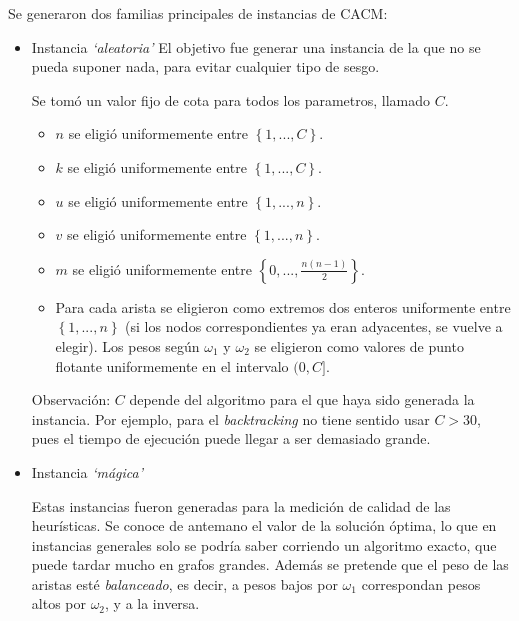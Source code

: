 Se generaron dos familias principales de instancias de CACM:

\begin{itemize}
    \item Instancia \textit{`aleatoria'}
El objetivo fue generar una instancia de la que no se pueda suponer nada, para evitar cualquier tipo de sesgo.

Se tomó un valor fijo de cota para todos los parametros, llamado $C$.

\begin{itemize}
    \item $n$ se eligió uniformemente entre $\left\{{1, ..., C}\right\}$.
    \item $k$ se eligió uniformemente entre $\left\{{1, ..., C}\right\}$.
    \item $u$ se eligió uniformemente entre $\left\{{1, ..., n}\right\}$.
    \item $v$ se eligió uniformemente entre $\left\{{1, ..., n}\right\}$.
    \item $m$ se eligió uniformemente entre $\left\{{0, ..., \frac{n(n-1)}{2}}\right\}$.
    \item Para cada arista se eligieron como extremos dos enteros uniformente entre $\left\{{1, ..., n}\right\}$ (si los nodos correspondientes ya eran adyacentes, se vuelve a elegir). Los pesos según $\omega_1$ y $\omega_2$ se eligieron como valores de punto flotante uniformemente en el intervalo $(0, C]$.
\end{itemize}
Observación: $C$ depende del algoritmo para el que haya sido generada la instancia. Por ejemplo, para el \textit{backtracking} no tiene sentido usar $C > 30$, pues el tiempo de ejecución puede llegar a ser demasiado grande.

    \item Instancia \textit{`mágica'}

Estas instancias fueron generadas para la medición de calidad de las heurísticas. Se conoce de antemano el valor de la solución óptima, lo que en instancias generales solo se podría saber corriendo un algoritmo exacto, que puede tardar mucho en grafos grandes. Además se pretende que el peso de las aristas esté \textit{balanceado}, es decir, a pesos bajos por $\omega_1$ correspondan pesos altos por $\omega_2$, y a la inversa.


\end{itemize}
